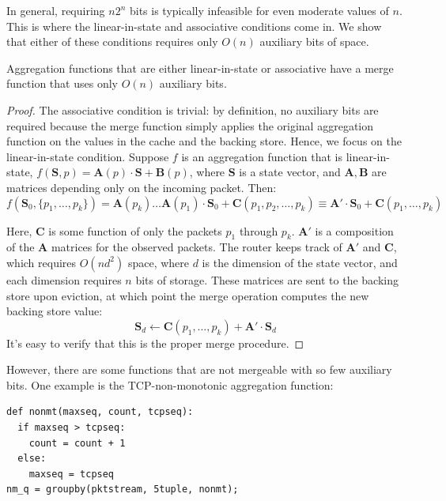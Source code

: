 In general, requiring $n2^n$ bits is typically infeasible for even moderate values of $n$. This is where the linear-in-state and associative conditions come in. We show that either of these conditions requires only $O(n)$ auxiliary bits of space.

\begin{theorem}
 Aggregation functions that are either linear-in-state or associative have a
merge function that uses only $O(n)$ auxiliary bits.
\end{theorem}
\begin{proof}
The associative condition is trivial: by definition, no auxiliary bits are required because the merge function simply applies the original aggregation function on the values in the cache and the backing store. Hence, we focus on the linear-in-state condition.
Suppose $f$ is an aggregation function that is linear-in-state, \ie $f(\mathbf{S}, p) = \mathbf{A}(p) \cdot \mathbf{S} + \mathbf{B}(p)$, where $\mathbf{S}$ is a state vector, and $\mathbf{A,B}$ are matrices depending only on the incoming packet. Then:
\[ f(\mathbf{S}_0, \{p_1, \ldots, p_k\}) = \mathbf{A}(p_k)\ldots \mathbf{A}(p_1) \cdot \mathbf{S}_0 + \mathbf{C}(p_1, p_2, \ldots, p_k) \equiv \mathbf{A'} \cdot \mathbf{S}_0 + \mathbf{C}(p_1, \ldots, p_k)\]

Here, $\mathbf{C}$ is some function of only the packets $p_1$ through $p_k$.
$\mathbf{A'}$ is a composition of the $\mathbf{A}$ matrices for the observed
packets. The router keeps track of $\mathbf{A'}$ and $\mathbf{C}$, which
requires $O(nd^2)$ space, where $d$ is the dimension of the state vector, and
each dimension requires $n$ bits of storage. These matrices are sent to the
backing store upon eviction, at which point the merge operation computes the
new backing store value: \[ \mathbf{S}_d \leftarrow \mathbf{C}(p_1, \ldots,
p_k) + \mathbf{A'} \cdot \mathbf{S}_d \] It's easy to verify that this is the
proper merge procedure.
\end{proof}

However, there are some functions that are not mergeable with so few auxiliary
bits.  One example is the TCP-non-monotonic aggregation function:
\begin{verbatim}
def nonmt(maxseq, count, tcpseq):
  if maxseq > tcpseq:
    count = count + 1
  else:
    maxseq = tcpseq
nm_q = groupby(pktstream, 5tuple, nonmt);
\end{verbatim}

